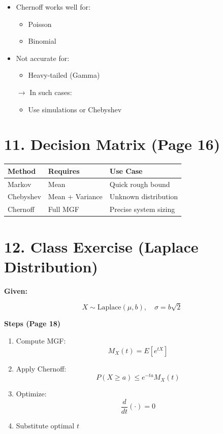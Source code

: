 \documentclass{article}
\begin{document}
\begin{itemize}
    \item Chernoff works well for:
    \begin{itemize}
        \item Poisson
        \item Binomial
    \end{itemize}
    \item Not accurate for:
    \begin{itemize}
        \item Heavy-tailed (Gamma)
    \end{itemize}
    $\rightarrow$ In such cases:
    \begin{itemize}
        \item Use simulations or Chebyshev
    \end{itemize}
\end{itemize}

\section*{11. Decision Matrix (Page 16)}

\begin{tabular}{lll}
\toprule
\textbf{Method} & \textbf{Requires} & \textbf{Use Case} \\
\midrule
Markov & Mean & Quick rough bound \\
Chebyshev & Mean + Variance & Unknown distribution \\
Chernoff & Full MGF & Precise system sizing \\
\bottomrule
\end{tabular}

\section*{12. Class Exercise (Laplace Distribution)}

\textbf{Given:}

\[X \sim \text{Laplace}(\mu, b), \quad \sigma = b\sqrt{2}\]

\textbf{Steps (Page 18)}

\begin{enumerate}
    \item Compute MGF:
    \[M_X(t) = E[e^{tX}]\]
    \item Apply Chernoff:
    \[P(X \ge a) \le e^{-ta} M_X(t)\]
    \item Optimize:
    \[\frac{d}{dt} (\cdot) = 0\]
    \item Substitute optimal $t$
\end{enumerate}
\end{document}
